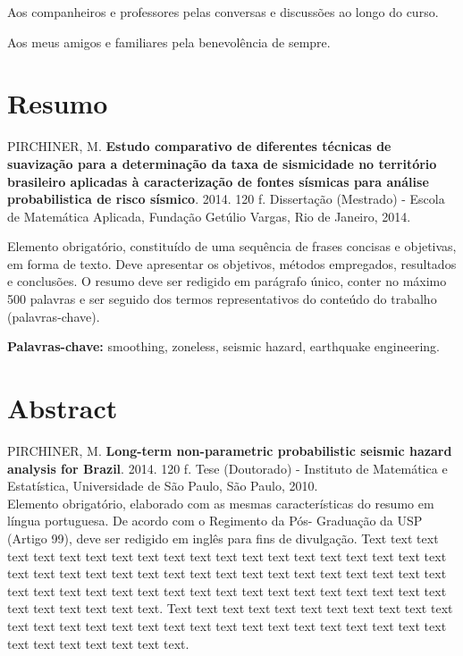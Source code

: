 \documentclass[12pt,twoside,a4paper]{book}
\begin{document}
Aos companheiros e professores pelas conversas e discussões ao longo do curso.

Aos meus amigos e familiares pela benevolência de sempre.


\chapter*{Resumo}

\noindent PIRCHINER, M. \textbf{Estudo comparativo de diferentes 
			técnicas de suavização para a determinação da 
		    taxa de sismicidade no território brasileiro 
		    aplicadas à caracterização de fontes sísmicas para 
		    análise probabilistica de risco sísmico}. 
2014. 120 f.
Dissertação (Mestrado) - Escola de Matemática Aplicada,
Fundação Getúlio Vargas, Rio de Janeiro, 2014.




Elemento
obrigatório, constituído de uma sequência de frases concisas e objetivas, em forma de texto.  
Deve apresentar os objetivos, métodos empregados, resultados e conclusões.  
O resumo deve ser redigido em parágrafo único, conter
no máximo 500 palavras e ser seguido dos termos representativos do conteúdo do
trabalho (palavras-chave). 



\noindent \textbf{Palavras-chave:} smoothing, zoneless, seismic hazard,
earthquake engineering.

\chapter*{Abstract}
\noindent PIRCHINER, M. \textbf{Long-term non-parametric probabilistic seismic
hazard analysis for Brazil}.
2014. 120 f.
Tese (Doutorado) - Instituto de Matemática e Estatística,
Universidade de São Paulo, São Paulo, 2010.
\\

Elemento obrigatório, elaborado com as mesmas características do resumo em
língua portuguesa. De acordo com o Regimento da Pós- Graduação da USP (Artigo
99), deve ser redigido em inglês para fins de divulgação. 
Text text text text text text text text text text text text text text text text
text text text text text text text text text text text text text text text text
text text text text text text text text text text text text text text text text
text text text text text text text text text text text text.
Text text text text text text text text text text text text text text text text
text text text text text text text text text text text text text text text text
text text text.
\\
\end{document}
